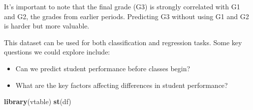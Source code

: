 \documentclass[
  11pt,
]{article}
\newenvironment{Shaded}{\begin{snugshade}}{\end{snugshade}}
\newcommand{\FunctionTok}[1]{\textcolor[rgb]{0.13,0.29,0.53}{\textbf{#1}}}
\newcommand{\NormalTok}[1]{#1}
\providecommand{\tightlist}{%
  \setlength{\itemsep}{0pt}\setlength{\parskip}{0pt}}
\begin{document}
It's important to note that the final grade (G3) is strongly correlated
with G1 and G2, the grades from earlier periods. Predicting G3 without
using G1 and G2 is harder but more valuable.

This dataset can be used for both classification and regression tasks.
Some key questions we could explore include:

\begin{itemize}
\tightlist
\item
  Can we predict student performance before classes begin?
\item
  What are the key factors affecting differences in student performance?
\end{itemize}

\begin{Shaded}
\begin{Highlighting}[]
\FunctionTok{library}\NormalTok{(vtable)}
\FunctionTok{st}\NormalTok{(df)}
\end{Highlighting}
\end{Shaded}
\end{document}
